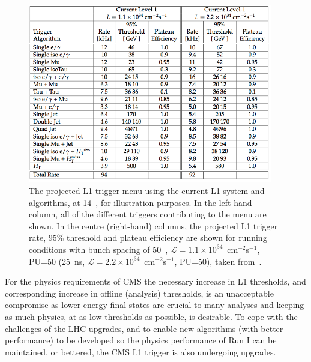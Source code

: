 \begin{figure}[htbp]
  \begin{center}
  \includegraphics[width=0.95\textwidth]{Figures/l1jets/triggerThresholdCurrentL1Table.png}
  \caption{The projected \ac{L1} trigger menu using the current \ac{L1} system and algorithms, at 14~\TeV, for illustration purposes. In the left hand column, all of the different triggers contributing to the menu are shown. In the centre (right-hand) columns, the projected L1 trigger rate, 95\% threshold and plateau efficiency are shown for running conditions with bunch spacing of 50~\ns, $\mathcal{L}=1.1 \times 10^{34}$~cm$^{-2}$s$^{-1}$, PU=50 (25~ns, $\mathcal{L}=2.2 \times 10^{34}$~cm$^{-2}$s$^{-1}$, PU=50), taken from~\cite{Tapper:1556311}.
}
  \label{tab:L1TrigMenuCurrentSystem}
  \end{center}
\end{figure}


For the physics requirements of \ac{CMS} the necessary increase in \ac{L1} thresholds, and corresponding increase in offline (analysis) thresholds, is an unacceptable compromise as lower energy final states are crucial to many analyses and keeping as much physics, at as low thresholds as possible, is desirable.
To cope with the challenges of the \ac{LHC} upgrades, and to enable new algorithms (with better performance) to be developed so the physics performance of Run I can be maintained, or bettered, the \ac{CMS} \ac{L1} trigger is also undergoing upgrades. 



